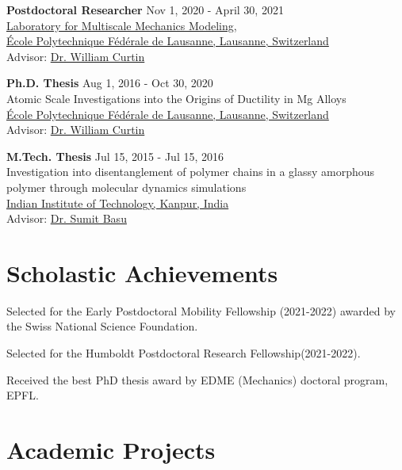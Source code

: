 \documentclass[margin,line]{resume}
\begin{document}
\begin{resume}
    \textbf{\textsf{Postdoctoral Researcher}}    \hfill  \small{Nov 1, 2020 - April 30, 2021} \\
    \href{https://lammm.epfl.ch/}{Laboratory for Multiscale Mechanics Modeling}, \\
    \href{https://www.epfl.ch/en/}{\'Ecole Polytechnique F\'ed\'erale de Lausanne, Lausanne, Switzerland}\\
    Advisor:  \href{https://people.epfl.ch//william.curtin?lang=en}{Dr. William Curtin}

    \textbf{\textsf{Ph.D. Thesis}}    \hfill  \small{Aug 1, 2016 - Oct 30, 2020} \\
    {Atomic Scale Investigations into the Origins of Ductility in Mg Alloys}\\
    \href{https://www.epfl.ch/en/}{\'Ecole Polytechnique F\'ed\'erale de Lausanne, Lausanne, Switzerland}\\
    Advisor:  \href{https://people.epfl.ch//william.curtin?lang=en}{Dr. William Curtin}

    \clearpage

    \textbf{\textsf{M.Tech. Thesis}} \hfill \small{Jul 15, 2015 - Jul 15, 2016} \\
    Investigation into disentanglement of polymer chains in a glassy amorphous polymer through molecular dynamics simulations \\
    \href{http://www.iitk.ac.in/}{Indian Institute of Technology, Kanpur, India}\\
    Advisor: \href{http://home.iitk.ac.in/~sbasu/}{Dr. Sumit Basu}



    \section{\mysidestyle Scholastic Achievements}  \vspace{0mm}

    Selected for the Early Postdoctoral Mobility Fellowship (2021-2022) awarded by the Swiss National Science Foundation.

    Selected for the Humboldt Postdoctoral Research Fellowship(2021-2022).

    Received the best PhD thesis award by EDME (Mechanics) doctoral program, EPFL.



    \section{\mysidestyle Academic Projects }


\end{resume}
\end{document}
